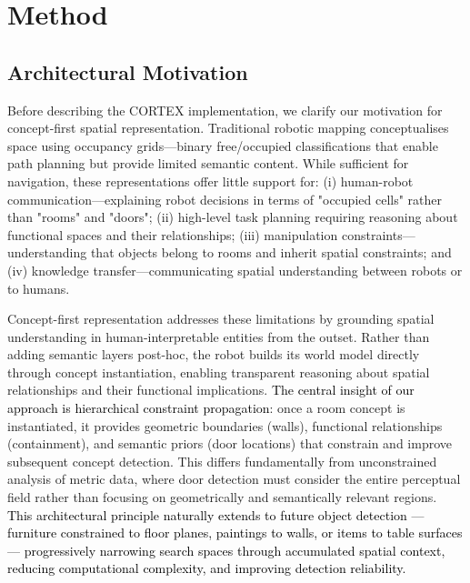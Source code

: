 \documentclass[10pt,a4paper]{article}
\begin{document}
%
%

%

\section{Method}

\subsection{Architectural Motivation}
Before describing the CORTEX implementation, we clarify our motivation for concept-first spatial representation. Traditional robotic mapping conceptualises space using occupancy grids—binary free/occupied classifications that enable path planning but provide limited semantic content. While sufficient for navigation, these representations offer little support for: (i) human-robot communication—explaining robot decisions in terms of "occupied cells" rather than "rooms" and "doors"; (ii) high-level task planning requiring reasoning about functional spaces and their relationships; (iii) manipulation constraints—understanding that objects belong to rooms and inherit spatial constraints; and (iv) knowledge transfer—communicating spatial understanding between robots or to humans.

%
%

Concept-first representation addresses these limitations by grounding spatial understanding in human-interpretable entities from the outset. Rather than adding semantic layers post-hoc, the robot builds its world model directly through concept instantiation, enabling transparent reasoning about spatial relationships and their functional implications.
\textcolor{black}{The central insight of our approach is hierarchical constraint propagation}: once a room concept is instantiated, it provides geometric boundaries (walls), functional relationships (containment), and semantic priors (door locations) that constrain and improve subsequent concept detection. This differs fundamentally from unconstrained analysis of metric data, where door detection must consider the entire perceptual field rather than focusing on geometrically and semantically relevant regions. \textcolor{black}{This architectural principle naturally extends to future object detection — furniture constrained to floor planes, paintings to walls, or items to table surfaces — progressively narrowing search spaces through accumulated spatial context, reducing computational complexity, and improving detection reliability.}
\end{document}
